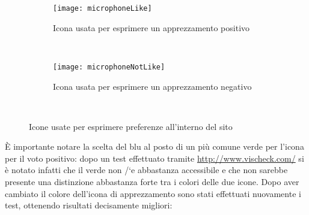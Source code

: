 \begin{figure}[H]
    \centering
    \begin{subfigure}[b]{0.4\textwidth}
        \texttt{[image: microphoneLike]}
        \caption{Icona usata per esprimere un apprezzamento positivo}
    \end{subfigure}
    ~
    \begin{subfigure}[b]{0.4\textwidth}
        \texttt{[image: microphoneNotLike]}
        \caption{Icona usata per esprimere un apprezzamento negativo}
    \end{subfigure}
    ~
    \caption{Icone usate per esprimere preferenze all'interno del sito}
\end{figure}

\`E importante notare la scelta del blu al posto di un pi\`u comune verde per l'icona per il voto positivo: dopo un test effettuato tramite \url{http://www.vischeck.com/} si \`e notato infatti che il verde non /`e abbastanza accessibile e che non sarebbe presente una distinzione abbastanza forte tra i colori delle due icone. Dopo aver cambiato il colore dell'icona di apprezzamento sono stati effettuati nuovamente i test, ottenendo risultati decisamente migliori:
